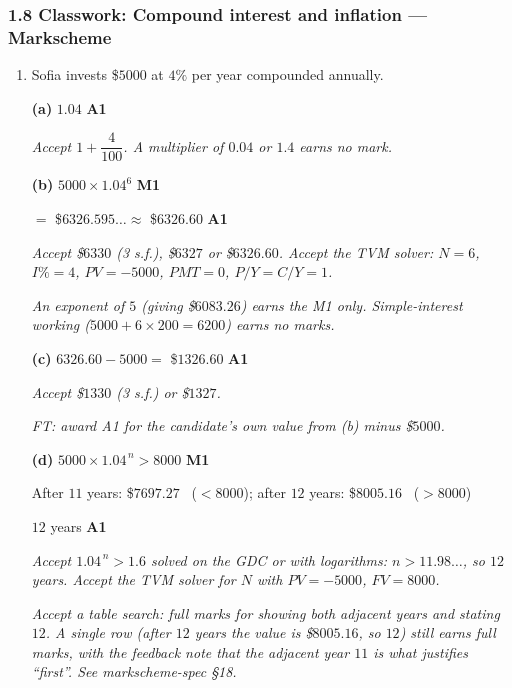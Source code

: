 \documentclass[12pt, twoside]{article}
\begin{document}
\subsubsection*{1.8 Classwork: Compound interest and inflation --- Markscheme}

\begin{enumerate}[itemsep=0.3cm]

\item[1.] [Maximum mark: 6]

Sofia invests \$$5000$ at $4\%$ per year compounded annually.

\medskip

\textbf{(a)} $1.04$ \hfill \textbf{A1}

\emph{Accept $1 + \dfrac{4}{100}$. A multiplier of $0.04$ or $1.4$ earns
no mark.}

\medskip

\textbf{(b)} $5000 \times 1.04^{6}$ \hfill \textbf{M1}

$=$ \$$6326.595\ldots \approx$ \$$6326.60$ \hfill \textbf{A1}

\emph{Accept \$$6330$ (3 s.f.), \$$6327$ or \$$6326.60$. Accept the TVM
solver: $N = 6$, $I\% = 4$, $PV = -5000$, $PMT = 0$, $P/Y = C/Y = 1$.}

\emph{An exponent of $5$ (giving \$$6083.26$) earns the M1 only.
Simple-interest working ($5000 + 6 \times 200 = 6200$) earns no marks.}

\medskip

\textbf{(c)} $6326.60 - 5000 = $ \$$1326.60$ \hfill \textbf{A1}

\emph{Accept \$$1330$ (3 s.f.) or \$$1327$.}

\emph{FT: award A1 for the candidate's own value from (b) minus
\$$5000$.}

\medskip

\textbf{(d)} $5000 \times 1.04^{\,n} > 8000$ \hfill \textbf{M1}

After $11$ years: \$$7697.27$ \ ($< 8000$); \quad after $12$ years:
\$$8005.16$ \ ($> 8000$)

$12$ years \hfill \textbf{A1}

\emph{Accept $1.04^{\,n} > 1.6$ solved on the GDC or with logarithms:
$n > 11.98\ldots$, so $12$ years. Accept the TVM solver for $N$ with
$PV = -5000$, $FV = 8000$.}

\emph{Accept a table search: full marks for showing both adjacent years
and stating $12$. A single row (after $12$ years the value is
\$$8005.16$, so $12$) still earns full marks, with the feedback note that
the adjacent year $11$ is what justifies ``first''. See markscheme-spec
§18.}


\end{enumerate}
\end{document}
